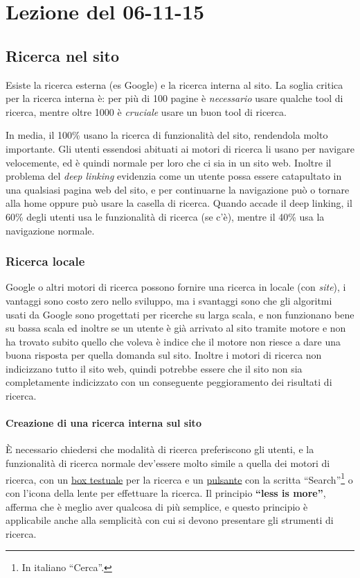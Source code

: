 \section{Lezione del 06-11-15}

\subsection{Ricerca nel sito}

Esiste la ricerca esterna (es Google) e la ricerca interna al sito. La soglia critica per la ricerca interna \`e: per pi\`u di 100 pagine \`e \textit{necessario} usare qualche tool di ricerca, mentre oltre 1000 \`e \textit{cruciale} usare un buon tool di ricerca.

In media, il 100\% usano la ricerca di funzionalit\`a del sito, rendendola molto importante. Gli utenti essendosi abituati ai motori di ricerca li usano per navigare velocemente, ed \`e quindi normale per loro che ci sia in un sito web. Inoltre il problema del \textit{deep linking} evidenzia come un utente possa essere catapultato in una qualsiasi pagina web del sito, e per continuarne la navigazione pu\`o o tornare alla home oppure pu\`o usare la casella di ricerca. Quando accade il deep linking, il 60\% degli utenti usa le funzionalit\`a di ricerca (se c'\`e), mentre il 40\% usa la navigazione normale.

\subsubsection{Ricerca locale}

Google o altri motori di ricerca possono fornire una ricerca in locale (con \textit{site}), i vantaggi sono costo zero nello sviluppo, ma i svantaggi sono che gli algoritmi usati da Google sono progettati per ricerche su larga scala, e non funzionano bene su bassa scala ed inoltre se un utente \`e gi\`a arrivato al sito tramite motore e non ha trovato subito quello che voleva \`e indice che il motore non riesce a dare una buona risposta per quella domanda sul sito. Inoltre i motori di ricerca non indicizzano tutto il sito web, quindi potrebbe essere che il sito non sia completamente indicizzato con un conseguente peggioramento dei risultati di ricerca.

\paragraph*{Creazione di una ricerca interna sul sito}\`E necessario chiedersi che modalit\`a di ricerca preferiscono gli utenti, e la funzionalit\`a di ricerca normale dev'essere molto simile a quella dei motori di ricerca, con un \underline{box testuale} per la ricerca e un \underline{pulsante} con la scritta ``Search''\footnote{In italiano ``Cerca''.} o con l'icona della lente per effettuare la ricerca.
Il principio \textbf{``less is more''}, afferma che \`e meglio aver qualcosa di pi\`u semplice, e questo principio \`e applicabile anche alla semplicit\`a con cui si devono presentare gli strumenti di ricerca.


